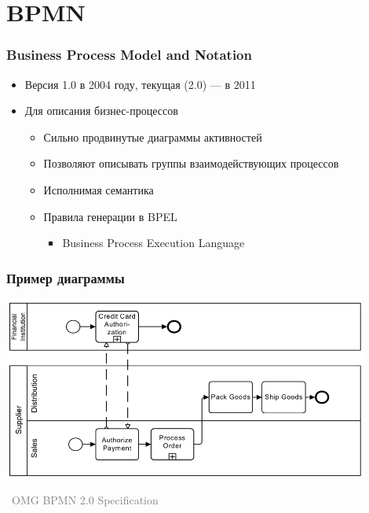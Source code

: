 \documentclass[xetex,mathserif,serif]{beamer}
\newcommand{\attribution}[1] {
	\vspace{-5mm}\begin{flushright}\begin{scriptsize}\textcolor{gray}{\textcopyright\, #1}\end{scriptsize}\end{flushright}
}
\begin{document}
	\section{BPMN}

	\begin{frame}
		\frametitle{Business Process Model and Notation}
		\begin{itemize}
			\item Версия 1.0 в 2004 году, текущая (2.0) --- в 2011
			\item Для описания бизнес-процессов
			\begin{itemize}
				\item Сильно продвинутые диаграммы активностей
				\item Позволяют описывать группы взаимодействующих процессов
				\item Исполнимая семантика
				\item Правила генерации в BPEL
				\begin{itemize}
					\item Business Process Execution Language
				\end{itemize}
			\end{itemize}
		\end{itemize}
	\end{frame}

	\begin{frame}
		\frametitle{Пример диаграммы}
		\begin{center}
			\includegraphics[width=0.9\textwidth]{bpmnExample.png}
			\attribution{OMG BPMN 2.0 Specification}
		\end{center}
	\end{frame}
\end{document}

